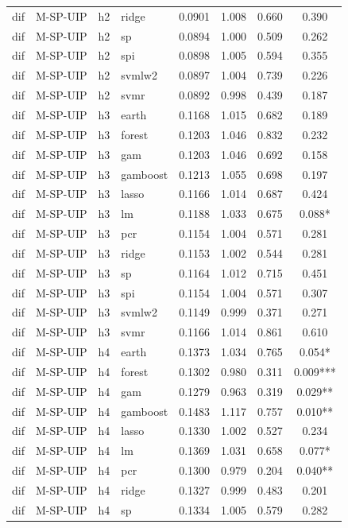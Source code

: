 \begin{ThreePartTable}
\begin{longtable}[t]{llclcccc}
dif & M-SP-UIP & h2 & ridge & 0.0901 & 1.008 & 0.660 & 0.390\\
dif & M-SP-UIP & h2 & sp & 0.0894 & 1.000 & 0.509 & 0.262\\
dif & M-SP-UIP & h2 & spi & 0.0898 & 1.005 & 0.594 & 0.355\\
dif & M-SP-UIP & h2 & svmlw2 & 0.0897 & 1.004 & 0.739 & 0.226\\
dif & M-SP-UIP & h2 & svmr & 0.0892 & 0.998 & 0.439 & 0.187\\
\addlinespace
dif & M-SP-UIP & h3 & earth & 0.1168 & 1.015 & 0.682 & 0.189\\
dif & M-SP-UIP & h3 & forest & 0.1203 & 1.046 & 0.832 & 0.232\\
dif & M-SP-UIP & h3 & gam & 0.1203 & 1.046 & 0.692 & 0.158\\
dif & M-SP-UIP & h3 & gamboost & 0.1213 & 1.055 & 0.698 & 0.197\\
dif & M-SP-UIP & h3 & lasso & 0.1166 & 1.014 & 0.687 & 0.424\\
dif & M-SP-UIP & h3 & lm & 0.1188 & 1.033 & 0.675 & 0.088*\\
dif & M-SP-UIP & h3 & pcr & 0.1154 & 1.004 & 0.571 & 0.281\\
dif & M-SP-UIP & h3 & ridge & 0.1153 & 1.002 & 0.544 & 0.281\\
dif & M-SP-UIP & h3 & sp & 0.1164 & 1.012 & 0.715 & 0.451\\
dif & M-SP-UIP & h3 & spi & 0.1154 & 1.004 & 0.571 & 0.307\\
dif & M-SP-UIP & h3 & svmlw2 & 0.1149 & 0.999 & 0.371 & 0.271\\
dif & M-SP-UIP & h3 & svmr & 0.1166 & 1.014 & 0.861 & 0.610\\
\addlinespace
dif & M-SP-UIP & h4 & earth & 0.1373 & 1.034 & 0.765 & 0.054*\\
dif & M-SP-UIP & h4 & forest & 0.1302 & 0.980 & 0.311 & 0.009***\\
dif & M-SP-UIP & h4 & gam & 0.1279 & 0.963 & 0.319 & 0.029**\\
dif & M-SP-UIP & h4 & gamboost & 0.1483 & 1.117 & 0.757 & 0.010**\\
dif & M-SP-UIP & h4 & lasso & 0.1330 & 1.002 & 0.527 & 0.234\\
dif & M-SP-UIP & h4 & lm & 0.1369 & 1.031 & 0.658 & 0.077*\\
dif & M-SP-UIP & h4 & pcr & 0.1300 & 0.979 & 0.204 & 0.040**\\
dif & M-SP-UIP & h4 & ridge & 0.1327 & 0.999 & 0.483 & 0.201\\
dif & M-SP-UIP & h4 & sp & 0.1334 & 1.005 & 0.579 & 0.282\\

\end{longtable}
\end{ThreePartTable}
